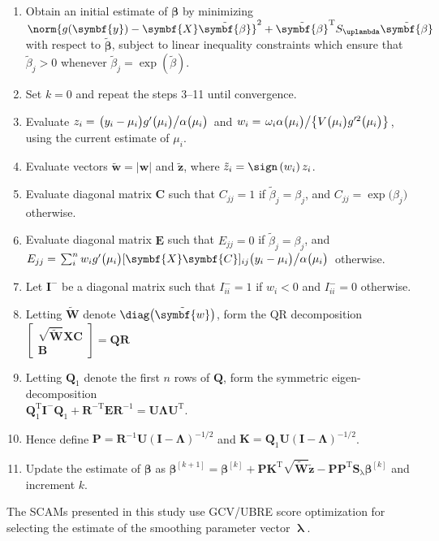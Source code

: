 \begin{enumerate}
\item Obtain an initial estimate of \(\symbf{\beta}\) by minimizing \(\norm{g(\symbf{y}) - \symbf{X} \tilde{\symbf{\beta}}}^2 + {\tilde{\symbf{\beta}}}^{\text{T}} S_\uplambda \tilde{\symbf{\beta}}\) with respect to \(\tilde{\symbf{\beta}}\), subject to linear inequality constraints which ensure that \(\tilde{\beta}_j > 0\) whenever \(\tilde{\beta}_j = \exp(\tilde{\beta})\).
\item Set \(k = 0\) and repeat the steps 3--11 until convergence.
\item Evaluate \(z_i = \left. \bigl(y_i - \mu_i\bigr) g'\bigl(\mu_i\bigr) \middle/ \alpha\bigl(\mu_i\bigr) \right.\) and \(w_i = \left. \omega_i \alpha\bigl(\mu_i\bigr) \middle/ \bigl\{V\bigl(\mu_i\bigr) g'^2\bigl(\mu_i\bigr)\bigr\} \right.\), using the current estimate of \(\mu_i\).
\item Evaluate vectors \(\tilde{\symbf{w}} = |\symbf{w}|\) and \(\tilde{\symbf{z}}\), where \(\tilde{z}_i = \sign\left(w_i\right) z_i\).
\item Evaluate diagonal matrix \(\symbf{C}\) such that \(C_{j j} = 1\) if \(\tilde{\beta}_j = \beta_j\), and \(C_{j j} = \exp\bigl(\beta_j\bigr)\) otherwise.
\item Evaluate diagonal matrix \(\symbf{E}\) such that \(E_{j j} = 0\) if \(\tilde{\beta}_j = \beta_j\), and \\
  \(E_{j j} = \left. \sum_i^n w_i g'\bigl(\mu_i\bigr) [\symbf{X} \symbf{C}]_{i j} \bigl(y_i - \mu_i\bigr) \middle/ \alpha\bigl(\mu_i\bigr) \right.\) otherwise.
\item Let \(\symbf{I}^-\) be a diagonal matrix such that \(I_{i i}^- = 1\) if \(w_i < 0\) and \(I_{i i}^- = 0\) otherwise.
\item Letting \(\tilde{\symbf{W}}\) denote \(\diag\bigl(\tilde{\symbf{w}}\bigr)\), form the QR decomposition \(
  \begin{bmatrix}
    \sqrt{\tilde{\symbf{W}}} \symbf{X} \symbf{C} \\
    \symbf{B}
  \end{bmatrix}
  = \symbf{Q} \symbf{R}
\)
\item Letting \(\symbf{Q}_1\) denote the first \(n\) rows of \(\symbf{Q}\), form the symmetric eigen-decomposition \\
  \(\symbf{Q}_1^{\text{T}} \symbf{I}^- \symbf{Q}_1 + \symbf{R}^{-\text{T}} \symbf{E} \symbf{R}^{-1} = \symbf{U} \symbf{\Lambda} \symbf{U}^{\text{T}}\).
\item Hence define \(\symbf{P} = \symbf{R}^{-1} \symbf{U}(\symbf{I} - \symbf{\Lambda})^{-1/2}\) and \(\symbf{K} = \symbf{Q}_1 \symbf{U} (\symbf{I} - \symbf{\Lambda})^{-1/2}\).
\item Update the estimate of \(\symbf{\beta}\) as \(\symbf{\beta}^{[k + 1]} = \symbf{\beta}^{[k]} + \symbf{P} \symbf{K}^{\text{T}} \sqrt{\tilde{\symbf{W}}} \tilde{\symbf{z}} - \symbf{P} \symbf{P}^{\text{T}} \symbf{S}_\uplambda \symbf{\beta}^{[k]}\) and increment \(k\).
\end{enumerate}
The SCAMs presented in this study use GCV/UBRE score optimization for selecting the estimate of the smoothing parameter vector \(\mathbf{\uplambda}\).


